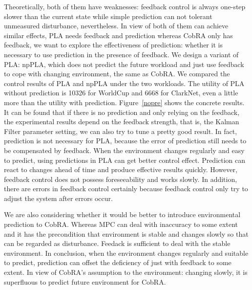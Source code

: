 \documentclass[sigconf]{acmart}
\begin{document}
Theoretically, both of them have weaknesses: feedback control is always one-step slower than the current state while simple prediction can not tolerant unmeasured disturbance, nevertheless. In view of both of them can achieve similar effects, PLA needs feedback and prediction whereas CobRA only has feedback, we want to explore the effectiveness of prediction: whether it is necessary to use prediction in the presence of feedback. We design a variant of PLA: npPLA, which does not predict the future workload and just use feedback to cope with changing environment, the same as CobRA. We compared the control results of PLA and npPLA under the two workloads. The utility of PLA without prediction is 10326 for WorldCup and 6668 for ClarkNet, even a little more than the utility with prediction. Figure~\ref{nopre} shows the concrete results. 
It can be found that if there is no prediction and only relying on the feedback, the experimental results depend on the feedback strength, that is, the Kalman Filter parameter setting, we can also try to tune a pretty good result.
In fact, prediction is not necessary for PLA, because the error of prediction still needs to be compensated by feedback. When the environment changes regularly and easy to predict, using predictions in PLA can get better control effect. Prediction can react to changes ahead of time and produce effective results quickly. However, feedback control does not possess foreseeability and works slowly. In addition, there are errors in feedback control certainly because feedback control only try to adjust the system after errors occur.

We are also considering whether it would be better to introduce environmental prediction to CobRA. Whereas MPC can deal with inaccuracy to some extent and it has the precondition that environment is stable and changes slowly so that can be regarded as disturbance. Feedack is sufficient to deal with the stable environment.
In conclusion, when the environment changes regularly and suitable to predict, prediction can offset the deficiency of just with feedback to some extent. In view of CobRA's assumption to the environment: changing slowly, it is superfluous to predict future environment for CobRA.
\end{document}
